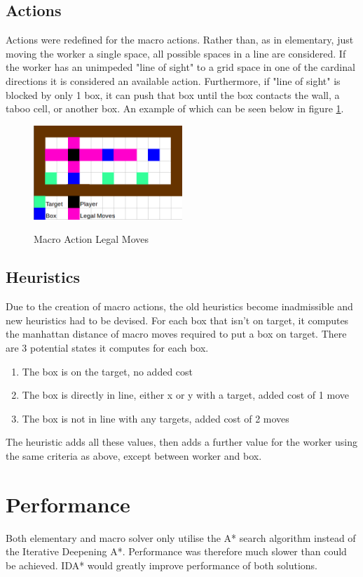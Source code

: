\documentclass[]{article}
\begin{document}
\subsection{Actions}
Actions were redefined for the macro actions. Rather than, as in elementary, just moving the worker a single space, all possible spaces in a line are considered. If the worker has an unimpeded "line of sight" to a grid space in one of the cardinal directions it is considered an available action. Furthermore, if "line of sight" is blocked by only 1 box, it can push that box until the box contacts the wall, a taboo cell, or another box. An example of which can be seen below in figure \ref{MacroAction}.
\begin{figure}[H]
	\centering
	\caption{Macro Action Legal Moves}
	\includegraphics[width=0.5\textwidth]{MacroAction.png}
	\label{MacroAction}
\end{figure}
\newpage
\subsection{Heuristics}
Due to the creation of macro actions, the old heuristics become inadmissible and new heuristics had to be devised. For each box that isn't on target, it computes the manhattan distance of macro moves required to put a box on target. There are 3 potential states it computes for each box.
\begin{enumerate}
	\item The box is on the target, no added cost
	\item The box is directly in line, either x or y with a target, added cost of 1 move
	\item The box is not in line with any targets, added cost of 2 moves
\end{enumerate}
The heuristic adds all these values, then adds a further value for the worker using the same criteria as above, except between worker and box.
\section{Performance}
Both elementary and macro solver only utilise the A* search algorithm instead of the Iterative Deepening A*. Performance was therefore much slower than could be achieved. IDA* would greatly improve performance of both solutions. 
\end{document}
